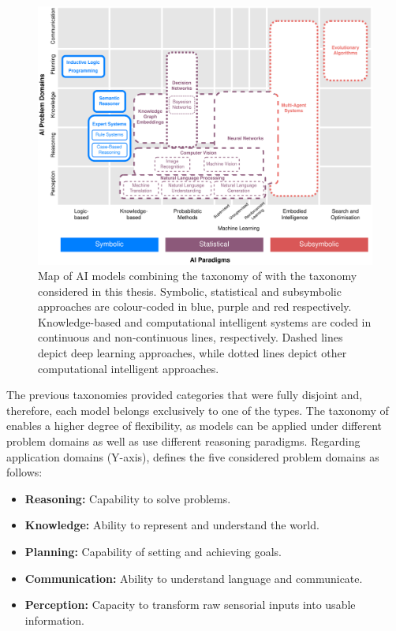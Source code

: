 \begin{figure}[t]
    \centering
    \includegraphics[width=\linewidth]{2_stateoftheart/figures/AI_Map.eps}
    \caption{Map of AI models combining the taxonomy of \cite{corea_ai_2019} with the taxonomy considered in this thesis. Symbolic, statistical and subsymbolic approaches are colour-coded in blue, purple and red respectively. Knowledge-based and computational intelligent systems are coded in continuous and non-continuous lines, respectively. Dashed lines depict deep learning approaches, while dotted lines depict other computational intelligent approaches.}
    \label{fig:ai_map}
\end{figure}


The previous taxonomies provided categories that were fully disjoint and, therefore, each model belongs exclusively to one of the types. The taxonomy of \cite{corea_ai_2019} enables a higher degree of flexibility, as models can be applied under different problem domains as well as use different reasoning paradigms. Regarding application domains (Y-axis), \cite{corea_ai_2019} defines the five considered problem domains as follows:
\begin{itemize}
    \item \textbf{Reasoning:} Capability to solve problems.
    \item \textbf{Knowledge:} Ability to represent and understand the world.
    \item \textbf{Planning:} Capability of setting and achieving goals.
    \item \textbf{Communication:} Ability to understand language and communicate.
    \item \textbf{Perception:} Capacity to transform raw sensorial inputs into usable information.
\end{itemize}

